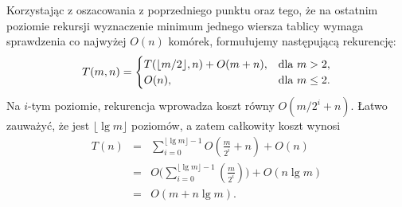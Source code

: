 \subsubsection{} %
Korzystając z oszacowania z poprzedniego punktu oraz tego, że na ostatnim poziomie rekursji wyznaczenie minimum jednego wiersza tablicy wymaga sprawdzenia co najwyżej $O(n)$ komórek, formułujemy następującą rekurencję:
\[
	T(m,n) =
	\begin{cases}
		T(\lfloor m/2\rfloor,n)+O(m+n), & \hbox{dla }m>2, \\
		O(n), & \hbox{dla }m\le2.
	\end{cases}
\]
Na $i$-tym poziomie, rekurencja wprowadza koszt równy $O(m/2^i+n)$. Łatwo zauważyć, że jest $\lfloor\lg m\rfloor$ poziomów, a zatem całkowity koszt wynosi
\begin{eqnarray*}
	T(n) &=& \sum_{i=0}^{\lfloor\lg m\rfloor-1}O\left(\frac{m}{2^i}+n\right)+O(n) \\
	&=& O\biggl(\sum_{i=0}^{\lfloor\lg m\rfloor-1}\left(\frac{m}{2^i}\right)\biggr)+O(n\lg m) \\
	&=& O(m+n\lg m).
\end{eqnarray*}
